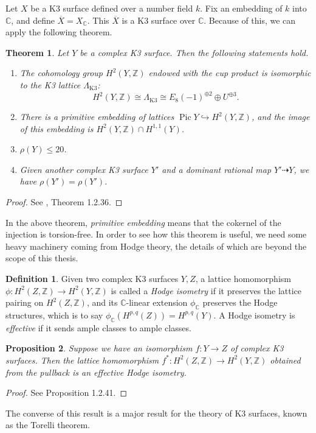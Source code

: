 \documentclass[12pt,twoside]{reedthesis}
\theoremstyle{plain}
\newtheorem{theorem}{Theorem}[chapter]
\newtheorem{proposition}[theorem]{Proposition}
\theoremstyle{definition}
\newtheorem{definition}{Definition}[section]
\theoremstyle{remark}
\newcommand{\ZZ}{\mathbb{Z}}
\newcommand{\CC}{\mathbb{C}}
\newcommand{\Pic}{\operatorname{Pic}}
\begin{document}
Let $X$ be a K3 surface defined over a number field $k$. Fix an embedding of $k$ into $\CC$, and define $\overline{X}=X_\CC$. This $\overline{X}$ is a K3 surface over $\CC$. Because of this, we can apply the following theorem.
\begin{theorem} Let $Y$ be a complex K3 surface. Then the following statements hold.
\begin{enumerate}
\item The cohomology group $H^2(Y,\ZZ)$ endowed with the cup product is isomorphic to the K3 lattice $\Lambda_{\text{K3}}$:
\[
H^2(Y,\ZZ)\cong\Lambda_{\text{K3}}\cong E_8(-1)^{\oplus2}\oplus U^{\oplus3}.
\]
\item There is a primitive embedding of lattices $\Pic Y\hookrightarrow H^2(Y,\ZZ)$, and the image of this embedding is $H^2(Y,\ZZ)\cap H^{1,1}(Y)$.
\item $\rho(Y)\leq20$.
\item Given another complex K3 surface $Y'$ and a dominant rational map $Y'\dashrightarrow Y$, we have $\rho(Y')=\rho(Y')$.
\end{enumerate}
\end{theorem}
\begin{proof}
See \cite{festiThesis}, Theorem 1.2.36.
\end{proof}
\noindent In the above theorem, \emph{primitive embedding} means that the cokernel of the injection is torsion-free. In order to see how this theorem is useful, we need some heavy machinery coming from Hodge theory, the details of which are beyond the scope of this thesis. 
\begin{definition}
Given two complex K3 surfaces $Y,Z$, a lattice homomorphism $\phi:H^2(Z,\ZZ)\to H^2(Y,\ZZ)$ is called a \emph{Hodge isometry} if it preserves the lattice pairing on $H^2(Z,\ZZ)$, and its $\CC$-linear extension $\phi_\CC$ preserves the Hodge structures, which is to say $\phi_\CC(H^{p,q}(Z))=H^{p,q}(Y)$. A Hodge isometry is \emph{effective} if it sends ample classes to ample classes.
\end{definition}
\begin{proposition}
Suppose we have an isomorphism $f: Y\to Z$ of complex K3 surfaces. Then the lattice homomorphism $f^*:H^2(Z,\ZZ)\to H^2(Y,\ZZ)$ obtained from the pullback is an effective Hodge isometry.
\end{proposition}
\begin{proof}
See \cite{festiThesis} Proposition 1.2.41.
\end{proof}
 The converse of this result is a major result for the theory of K3 surfaces, known as the Torelli theorem.
\end{document}
